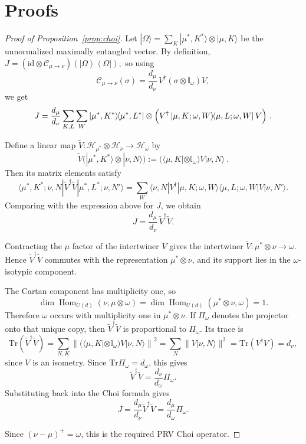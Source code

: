 \documentclass[a4paper,onecolumn,11pt]{quantumarticle}
\newcommand{\ket}[1]{| #1 \rangle}
\newcommand{\bra}[1]{\langle #1 |}
\newcommand{\ketbra}[2]{\left|#1\right\rangle\!\!\left\langle #2\right|}
\def\id{\mathbb{I}}
\newcommand*{\Tr}{\mathrm{Tr}}
\begin{document}
\section{Proofs}\label{app:proofs}
\begin{proof}[Proof of Proposition~\ref{prop:choi}]
Let
\(
\ket{\Omega}=\sum_K \ket{\mu^*,K^*}\otimes\ket{\mu,K}
\)
be the unnormalized maximally entangled vector. By definition,
\(
J=(\mathrm{id}\otimes\mathcal C_{\mu\to\nu})(\ketbra{\Omega}{\Omega}),
\)
so using
\[
\mathcal C_{\mu\to\nu}(\sigma)
=\frac{d_\mu}{d_\nu}\,V^\dagger(\sigma\otimes\id_\omega)V,
\]
we get
\[
J=\frac{d_\mu}{d_\nu}\sum_{K,L}\sum_W
\ketbra{\mu^*,K^*}{\mu^*,L^*}
\otimes
\Bigl(
V^\dagger \ketbra{\mu,K;\omega,W}{\mu,L;\omega,W} V
\Bigr)\ .
\]

Define a linear map
\(
\tilde V:\mathcal H_{\mu^*}\otimes\mathcal H_\nu\to \mathcal H_\omega
\) by
\[
\tilde V\bigl(\ket{\mu^*,K^*}\otimes\ket{\nu,N}\bigr)
:=
(\bra{\mu,K}\otimes\id_\omega)V\ket{\nu,N}\ .
\]
Then its matrix elements satisfy
\[
\bra{\mu^*,K^*;\nu,N}\tilde V^\dagger \tilde V\ket{\mu^*,L^*;\nu,N'}
=
\sum_W
\bra{\nu,N}V^\dagger\ket{\mu,K;\omega,W}
\bra{\mu,L;\omega,W}V\ket{\nu,N'}.
\]
Comparing with the expression above for \(J\), we obtain
\[
J=\frac{d_\mu}{d_\nu}\,\tilde V^\dagger \tilde V.
\]

Contracting the $\mu$ factor of the intertwiner $V$ gives the intertwiner
\(
\tilde V:\mu^*\otimes\nu\to\omega.
\)
Hence \(\tilde V^\dagger\tilde V\) commutes with the representation \(\mu^*\otimes\nu\), and its support lies in the \(\omega\)-isotypic component.

The Cartan component has multiplicity one, so
\[
\dim\operatorname{Hom}_{U(d)}(\nu,\mu\otimes\omega)
=\dim\operatorname{Hom}_{U(d)}(\mu^*\otimes\nu,\omega)=1.
\]
Therefore \(\omega\) occurs with multiplicity one in \(\mu^*\otimes\nu\). If \(\Pi_\omega\) denotes the projector onto that unique copy, then $\tilde V^\dagger\tilde V$ is proportional to $\Pi_\omega$.
Its trace is
\[
\Tr(\tilde V^\dagger\tilde V)
=
\sum_{N,K}\left\|
(\bra{\mu,K}\otimes\id_\omega)V\ket{\nu,N}
\right\|^2
=
\sum_N \|V\ket{\nu,N}\|^2
=
\Tr(V^\dagger V)
=
d_\nu,
\]
since \(V\) is an isometry. Since $\Tr\Pi_\omega=d_\omega$, this gives
\[
\tilde V^\dagger\tilde V=\frac{d_\nu}{d_\omega}\Pi_\omega.
\]
Substituting back into the Choi formula gives
\[
J=\frac{d_\mu}{d_\nu}\tilde V^\dagger\tilde V
=\frac{d_\mu}{d_\omega}\Pi_\omega.
\]

Since $(\nu-\mu)^+=\omega$, this is the required PRV Choi operator.
\end{proof}
\end{document}
